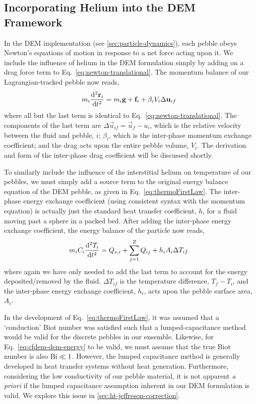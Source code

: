 \subsection{Incorporating Helium into the DEM Framework}\label{sec:cfdem-heat-transfer}

In the DEM implementation (see \cref{sec:particle-dynamics}), each pebble obeys Newton's equations of motion in response to a net force acting upon it. We include the influence of helium in the DEM formulation simply by adding on a drag force term to Eq.~\ref{eq:newton-translational}. The momentum balance of our Lagrangian-tracked pebble now reads,
\begin{equation}\label{eq:cfdem-dem-momentum}
	m_i  \frac{\mathrm{d}^2{\mathbf{r}_i}}{\mathrm{d}t^2} = m_i\mathbf{g} + \mathbf{f}_i + \beta_i V_i \Delta \mathbf{u}_{if}
\end{equation}
where all but the last term is identical to Eq.~\ref{eq:newton-translational}. The components of the last term are $\Delta \vec{u}_{if} = \vec{u}_f - u_i$, which is the relative velocity between the fluid and pebble, $i$; $\beta_i$, which is the inter-phase momentum exchange coefficient; and the drag acts upon the entire pebble volume, $V_i$. The derivation and form of the inter-phase drag coefficient will be discussed shortly.

To similarly include the influence of the interstitial helium on temperature of our pebbles, we must simply add a source term to the original energy balance equation of the DEM pebble, as given in Eq.~\ref{eq:thermoFirstLaw}. The inter-phase energy exchange coefficient (using consistent syntax with the momentum equation) is actually just the standard heat transfer coefficient, $h$, for a fluid moving past a sphere in a packed bed. After adding the inter-phase energy exchange coefficient, the energy balance of the particle now reads,
\begin{equation}\label{eq:cfdem-dem-energy}
	m_iC_i \frac{\mathrm{d}^2{T_i}}{\mathrm{d}t^2} = Q_{s,i} + \sum_{j=1}^Z Q_{ij} + h_i A_i \Delta T_{if}
\end{equation}
where again we have only needed to add the last term to account for the energy deposited/removed by the fluid. $\Delta T_{if}$ is the temperature difference, $T_f - T_i$, and the inter-phase energy exchange coefficient, $h_i$, acts upon the pebble surface area, $A_i$.

In the development of Eq.~\ref{eq:thermoFirstLaw}, it was assumed that a `conduction' Biot number was satisfied such that a lumped-capacitance method would be valid for the discrete pebbles in our ensemble. Likewise, for Eq.~\ref{eq:cfdem-dem-energy} to be valid, we must assume that the true Biot number is also $\mathrm{Bi} \ll 1$. However, the lumped capacitance method is generally developed in heat transfer systems without heat generation. Furthermore, considering the low conductivity of our pebble material, it is not apparent \textit{a priori} if the lumped capacitance assumption inherent in our DEM formulation is valid. We explore this issue in \cref{sec:ht-jeffreson-correction}.

